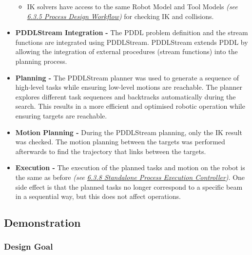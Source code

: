 \documentclass[11pt]{book}
\begin{document}
\begin{itemize}
\begin{itemize}
	\item IK solvers have access to the same Robot Model and Tool Models \textit{(see \uline{6.3.5 Process Design Workflow})} for checking IK and collisions.

\end{itemize}
	\item \textbf{PDDLStream Integration} \textbf{-} The PDDL problem definition and the stream functions are integrated using PDDLStream. PDDLStream extends PDDL by allowing the integration of external procedures (stream functions) into the planning process.

	\item \textbf{Planning - }The PDDLStream planner was used to generate a sequence of high-level tasks while ensuring low-level motions are reachable. The planner explores different task sequences and backtracks automatically during the search. This results in a more efficient and optimised robotic operation while ensuring targets are reachable.

	\item \textbf{Motion Planning - }During the PDDLStream planning, only the IK result was checked. The motion planning between the targets was performed afterwards to find the trajectory that links between the targets.

	\item \textbf{Execution - }The execution of the planned tasks and motion on the robot is the same as before \textit{(see \uline{6.3.8 Standalone Process Execution Controller})}. One side effect is that the planned tasks no longer correspond to a specific beam in a sequential way, but this does not affect operations.

\end{itemize}
\subsection{Demonstration}

\subsubsection{Design Goal}
\end{document}

